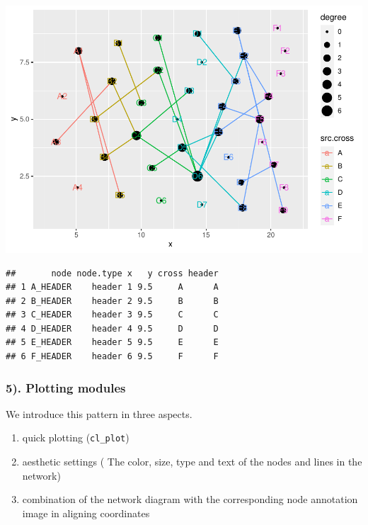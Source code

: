\documentclass[
]{article}
\newenvironment{Shaded}{\begin{snugshade}}{\end{snugshade}}
\newcommand{\CommentTok}[1]{\textcolor[rgb]{0.56,0.35,0.01}{\textit{#1}}}
\newcommand{\DataTypeTok}[1]{\textcolor[rgb]{0.13,0.29,0.53}{#1}}
\newcommand{\KeywordTok}[1]{\textcolor[rgb]{0.13,0.29,0.53}{\textbf{#1}}}
\newcommand{\NormalTok}[1]{#1}
\newcommand{\OperatorTok}[1]{\textcolor[rgb]{0.81,0.36,0.00}{\textbf{#1}}}
\newcommand{\StringTok}[1]{\textcolor[rgb]{0.31,0.60,0.02}{#1}}
\providecommand{\tightlist}{%
  \setlength{\itemsep}{0pt}\setlength{\parskip}{0pt}}
\begin{document}
\includegraphics{ReadMe_files/figure-latex/unnamed-chunk-6-6.pdf}

\begin{Shaded}
\end{Shaded}

\begin{verbatim}
##       node node.type x   y cross header
## 1 A_HEADER    header 1 9.5     A      A
## 2 B_HEADER    header 2 9.5     B      B
## 3 C_HEADER    header 3 9.5     C      C
## 4 D_HEADER    header 4 9.5     D      D
## 5 E_HEADER    header 5 9.5     E      E
## 6 F_HEADER    header 6 9.5     F      F
\end{verbatim}

\hypertarget{plotting-modules}{%
\subsubsection{5). Plotting modules}\label{plotting-modules}}

We introduce this pattern in three aspects.

\begin{enumerate}
\def\labelenumi{\alph{enumi}.}
\tightlist
\item
  quick plotting (\texttt{cl\_plot})
\item
  aesthetic settings ( The color, size, type and text of the nodes and
  lines in the network)
\item
  combination of the network diagram with the corresponding node
  annotation image in aligning coordinates
\end{enumerate}
\end{document}
